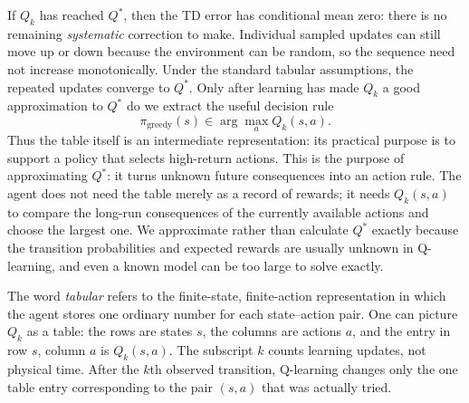 \documentclass[11pt,a4paper]{article}
\theoremstyle{definition}
\begin{document}
\begin{note}
If $Q_k$ has reached $Q^*$, then the TD error has conditional mean zero: there is no remaining
\emph{systematic} correction to make. Individual sampled updates can still move up or down
because the environment can be random, so the sequence need not increase monotonically. Under
the standard tabular assumptions, the repeated updates converge to $Q^*$. Only after learning
has made $Q_k$ a good approximation to $Q^*$ do we extract the useful decision rule
\[
\pi_{\mathrm{greedy}}(s)\in\arg\max_a Q_k(s,a).
\]
Thus the table itself is an intermediate representation: its practical purpose is to support a
policy that selects high-return actions. This is the purpose of approximating $Q^*$: it turns
unknown future consequences into an action rule. The agent does not need the table merely as a
record of rewards; it needs $Q_k(s,a)$ to compare the long-run consequences of the currently
available actions and choose the largest one. We approximate rather than calculate $Q^*$ exactly
because the transition probabilities and expected rewards are usually unknown in Q-learning, and
even a known model can be too large to solve exactly.

The word \emph{tabular} refers to the finite-state, finite-action representation in which the
agent stores one ordinary number for each state--action pair. One can picture $Q_k$ as a table:
the rows are states $s$, the columns are actions $a$, and the entry in row $s$, column $a$ is
$Q_k(s,a)$. The subscript $k$ counts learning updates, not physical time. After the $k$th
observed transition, Q-learning changes only the one table entry corresponding to the pair
$(s,a)$ that was actually tried.


\end{note}
\end{document}
